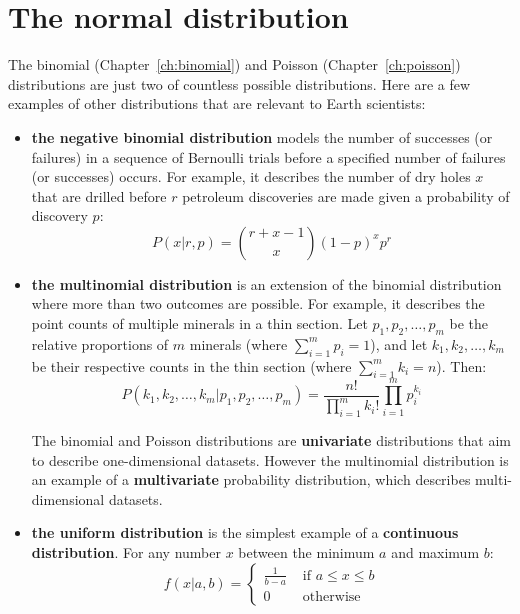 \chapter{The normal distribution}
\label{ch:normal}

The binomial (Chapter~\ref{ch:binomial}) and Poisson
(Chapter~\ref{ch:poisson}) distributions are just two of countless
possible distributions.  Here are a few examples of other
distributions that are relevant to Earth scientists:

\begin{itemize}

\item{\bf the negative binomial distribution} models the number of
  successes (or failures) in a sequence of Bernoulli trials before a
  specified number of failures (or successes) occurs. For example, it
  describes the number of dry holes $x$ that are drilled before $r$
  petroleum discoveries are made given a probability of discovery $p$:
  \begin{equation}
    P(x|r,p) = \binom{r+x-1}{x} (1-p)^x p^r
  \end{equation}

\item{\bf the multinomial distribution} is an extension of the
  binomial distribution where more than two outcomes are possible. For
  example, it describes the point counts of multiple minerals in a
  thin section. Let $p_1,p_2,\ldots,p_m$ be the relative proportions
  of $m$ minerals (where $\sum_{i=1}^{m}p_i=1$), and let
  $k_1,k_2,\ldots,k_m$ be their respective counts in the thin section
  (where $\sum_{i=1}^{m}k_i=n$). Then:
  \begin{equation}
    P(k_1,k_2,\ldots,k_m|p_1,p_2,\ldots,p_m) =
    \frac{n!}{\prod\limits_{i=1}^{m}k_i!} \prod\limits_{i=1}^{m}p_i^{k_i}
  \end{equation}

  The binomial and Poisson distributions are \textbf{univariate}
  distributions that aim to describe one-dimensional datasets. However
  the multinomial distribution is an example of a
  \textbf{multivariate} probability distribution, which describes
  multi-dimensional datasets.

\item{\bf the uniform distribution} is the simplest example of a
  \textbf{continuous distribution}. For any number $x$ between the
  minimum $a$ and maximum $b$:
  \begin{equation}
    f(x|a,b) =
  \begin{cases}
       \frac{1}{b-a} & \mbox{~if~} a \leq x \leq b\\
       0 & \mbox{~otherwise}
  \end{cases}
  \end{equation}
  

\end{itemize}
